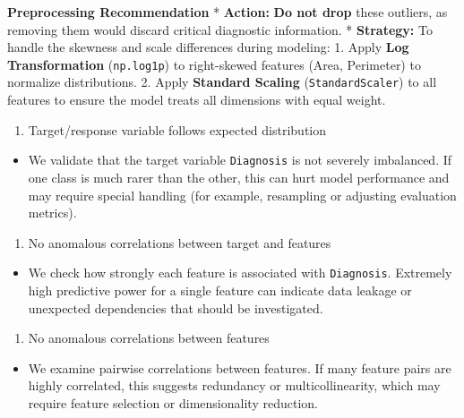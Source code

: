 \documentclass[
  letterpaper,
  DIV=11,
  numbers=noendperiod]{scrartcl}
\providecommand{\tightlist}{%
  \setlength{\itemsep}{0pt}\setlength{\parskip}{0pt}}
\begin{document}
\textbf{Preprocessing Recommendation} * \textbf{Action:} \textbf{Do not
drop} these outliers, as removing them would discard critical diagnostic
information. * \textbf{Strategy:} To handle the skewness and scale
differences during modeling: 1. Apply \textbf{Log Transformation}
(\texttt{np.log1p}) to right-skewed features (Area, Perimeter) to
normalize distributions. 2. Apply \textbf{Standard Scaling}
(\texttt{StandardScaler}) to all features to ensure the model treats all
dimensions with equal weight.

\begin{enumerate}
\def\labelenumi{\arabic{enumi}.}
\setcounter{enumi}{8}
\tightlist
\item
  Target/response variable follows expected distribution
\end{enumerate}

\begin{itemize}
\tightlist
\item
  We validate that the target variable \texttt{Diagnosis} is not
  severely imbalanced. If one class is much rarer than the other, this
  can hurt model performance and may require special handling (for
  example, resampling or adjusting evaluation metrics).
\end{itemize}

\begin{enumerate}
\def\labelenumi{\arabic{enumi}.}
\tightlist
\item
  No anomalous correlations between target and features
\end{enumerate}

\begin{itemize}
\tightlist
\item
  We check how strongly each feature is associated with
  \texttt{Diagnosis}. Extremely high predictive power for a single
  feature can indicate data leakage or unexpected dependencies that
  should be investigated.
\end{itemize}

\begin{enumerate}
\def\labelenumi{\arabic{enumi}.}
\tightlist
\item
  No anomalous correlations between features
\end{enumerate}

\begin{itemize}
\tightlist
\item
  We examine pairwise correlations between features. If many feature
  pairs are highly correlated, this suggests redundancy or
  multicollinearity, which may require feature selection or
  dimensionality reduction.
\end{itemize}
\end{document}
